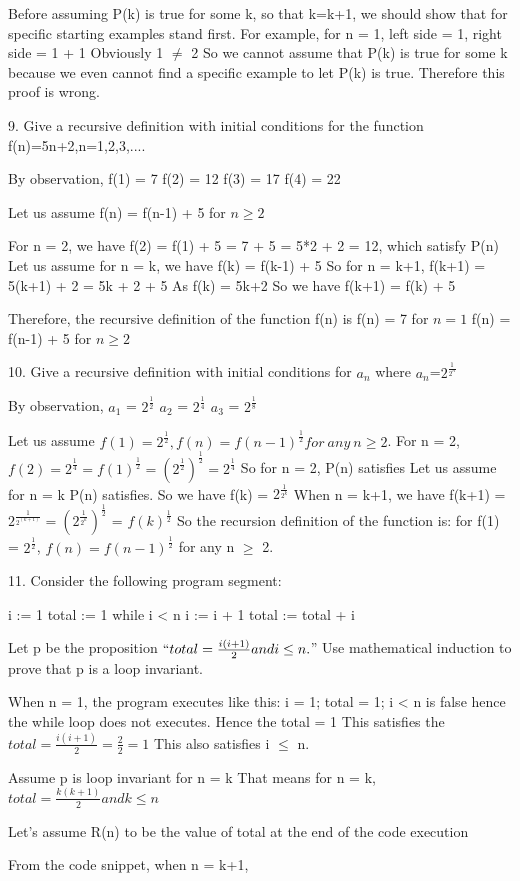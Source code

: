 \documentclass{article}
\begin{document}
\begin{large}
Before assuming P(k) is true for some k, so that k=k+1, we should show that for specific starting examples stand first.
For example, for n = 1, left side = 1, right side = 1 + 1
Obviously 1 $\neq$ 2
So we cannot assume that P(k) is true for some k because we even cannot find a specific example to let P(k) is true.
Therefore this proof is wrong.

9. Give a recursive definition with initial conditions for the function f(n)=5n+2,n=1,2,3,....

By observation, 
f(1) = 7
f(2) = 12
f(3) = 17
f(4) = 22

Let us assume f(n) = f(n-1) + 5 for $n \ge 2$

For n = 2, we have f(2) = f(1) + 5 = 7 + 5 = 5*2 + 2 = 12, which satisfy P(n)
Let us assume for n = k, we have f(k) = f(k-1) + 5
So for n = k+1, f(k+1) = 5(k+1) + 2 = 5k + 2 + 5
As f(k) = 5k+2
So we have f(k+1) = f(k) + 5

Therefore, the recursive definition of the function f(n) is
f(n) = 7 for $n = 1$
f(n) = f(n-1) + 5 for $n \ge 2$

10. Give a recursive definition with initial conditions for {$a_{n}$} where $a_{n}$=$2^{\frac{1}{2^n}}$

By observation, 
$a_{1}$ = $2^{\frac {1}{2}}$
$a_{2}$ = $2^{\frac {1}{4}}$
$a_{3}$ = $2^{\frac {1}{8}}$

Let us assume $f(1) = 2^{\frac{1}{2}}, f(n) = f(n-1) ^{\frac {1}{2}} for\ any\ n \ge 2$.
For n = 2, $f(2) = 2^{\frac{1}{4}} = f(1) ^{\frac {1}{2}} = (2^{\frac{1}{2}})^{\frac{1}{2}} = 2^{\frac{1}{4}}$
So for n = 2, P(n) satisfies
Let us assume for n = k P(n) satisfies. So we have f(k) = $2^{\frac{1}{2^k}}$
When n = k+1, we have f(k+1) = $2^{\frac{1}{2^(k+1)}} = (2^{\frac{1}{2^k}})^{\frac{1}{2}}$
                             = $f(k)^{\frac{1}{2}}$
So the recursion definition of the function is: 
for f(1) = $2^{\frac{1}{2}}$, $f(n) = f(n-1) ^{\frac {1}{2}}$ for any n $\ge$ 2.


11. Consider the following program segment:

i := 1
total := 1 
while i < n
  i := i + 1
  total := total + i

Let p be the proposition $``total = \frac{i(i+1)}{2} and i \le n.$'' Use mathematical induction to prove that p is a loop invariant.

When n = 1, the program executes like this: 
  i = 1; total = 1; i < n is false hence the while loop does not executes. 
  Hence the total = 1
  This satisfies the $total = \frac{i(i+1)}{2} = \frac{2}{2} = 1$
  This also satisfies i $\le$ n.

Assume p is loop invariant for n = k
That means for n = k, $total = \frac{k(k+1)}{2} and k \le n$

Let's assume R(n) to be the 
value of total at the end of the code execution

From the code snippet, when n = k+1,

\end{large}
\end{document}
